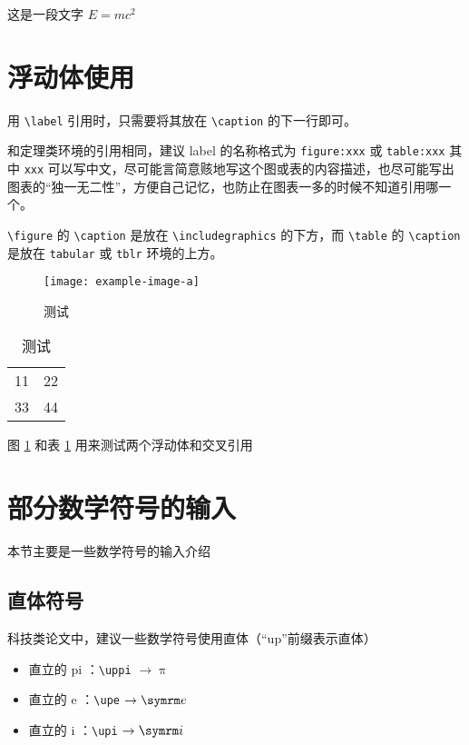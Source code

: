 \begin{remark}
  这是一段文字 $E = m c^2$
\end{remark}



\section{浮动体使用}

用 \verb|\label| 引用时，只需要将其放在 \verb|\caption| 的下一行即可。

和定理类环境的引用相同，建议 label 的名称格式为 \verb|figure:xxx| 或 \verb|table:xxx| 其中 \verb|xxx| 可以写中文，尽可能言简意赅地写这个图或表的内容描述，也尽可能写出图表的“独一无二性”，方便自己记忆，也防止在图表一多的时候不知道引用哪一个。

\verb|\figure| 的 \verb|\caption| 是放在 \verb|\includegraphics| 的下方，而 \verb|\table| 的 \verb|\caption| 是放在 \verb|tabular| 或 \verb|tblr| 环境的上方。

\begin{figure}[htbp]
  \centering
  \texttt{[image: example-image-a]}
  \caption{测试}
  \label{figure:test}
\end{figure}

\begin{table}[htbp]
  \centering
  \caption{测试}
  \label{table:test}
  \begin{tabular}{|c|c|}
    11 & 22 \\
    33 & 44 
  \end{tabular}
\end{table}

图 \ref{figure:test} 和表 \ref{table:test} 用来测试两个浮动体和交叉引用



\section{部分数学符号的输入}

本节主要是一些数学符号的输入介绍


\subsection{直体符号}

科技类论文中，建议一些数学符号使用直体（“up”前缀表示直体）
  \begin{itemize}
    \item 直立的 pi ：\verb|\uppi| $\to \uppi$
    \item 直立的 e ：\verb|\upe| $\to \upe$
    \item 直立的 i ：\verb|\upi| $\to \upi$
  \end{itemize}



